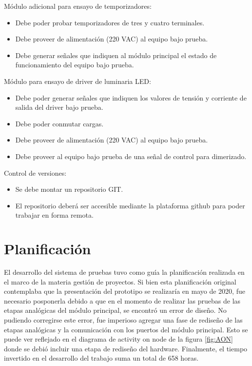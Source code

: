 Módulo adicional para ensayo de temporizadores:

\begin{itemize}
	\item Debe poder probar temporizadores de tres y cuatro terminales.
	\item Debe proveer de alimentación (220 VAC) al equipo bajo prueba.
	\item Debe generar señales que indiquen al módulo principal el estado de funcionamiento del equipo bajo prueba. 
	
\end{itemize}

Módulo para ensayo de driver de luminaria LED:

\begin{itemize}
	\item Debe poder generar señales que indiquen los valores de tensión y corriente de salida del driver bajo prueba.
	\item Debe poder conmutar cargas.
	\item Debe proveer de alimentación (220 VAC) al equipo bajo prueba.
	\item Debe proveer al equipo bajo prueba de una señal de control para dimerizado.
\end{itemize}

Control de versiones:

\begin{itemize}
	\item Se debe montar un repositorio GIT.
	\item El repositorio deberá ser accesible mediante la plataforma github para poder trabajar en forma remota.
\end{itemize}

\section{Planificación}
El desarrollo del sistema de pruebas tuvo como guía la planificación realizada en el marco de la materia gestión de proyectos. Si bien esta planificación original contemplaba que la presentación del prototipo se realizaría en mayo de 2020, fue necesario posponerla debido a que en el momento de realizar las pruebas de las etapas analógicas del módulo principal, se encontró un error de diseño. No pudiendo corregirse este error, fue imperioso agregar una fase de rediseño de las etapas analógicas y la comunicación con los puertos del módulo principal. Esto se puede ver reflejado en el diagrama de activity on node de la figura \ref{fig:AON} donde se debió incluir una etapa de rediseño del hardware. 
Finalmente, el tiempo invertido en el desarrollo del trabajo suma un total de 658 horas.

